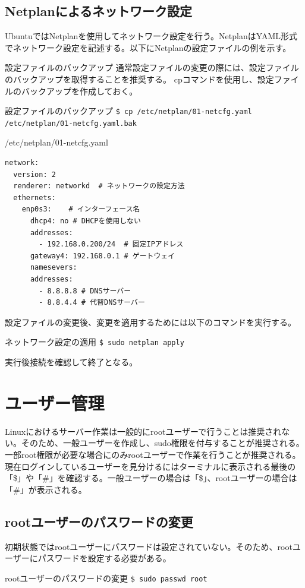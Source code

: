 \documentclass[a4paper, 11pt, dvipdfmx]{jsarticle}
\begin{document}
\subsection{Netplanによるネットワーク設定}
UbuntuではNetplanを使用してネットワーク設定を行う。NetplanはYAML形式でネットワーク設定を記述する。以下にNetplanの設定ファイルの例を示す。
\begin{attentionbox}{設定ファイルのバックアップ}
  通常設定ファイルの変更の際には、設定ファイルのバックアップを取得することを推奨する。
  cpコマンドを使用し、設定ファイルのバックアップを作成しておく。
  \begin{commandbox}{設定ファイルのバックアップ}
    \verb|$ cp /etc/netplan/01-netcfg.yaml /etc/netplan/01-netcfg.yaml.bak|
  \end{commandbox}
\end{attentionbox}
\begin{commandbox}{/etc/netplan/01-netcfg.yaml}
  \begin{verbatim}
network:
  version: 2
  renderer: networkd  # ネットワークの設定方法
  ethernets:
    enp0s3:    # インターフェース名
      dhcp4: no # DHCPを使用しない
      addresses: 
        - 192.168.0.200/24  # 固定IPアドレス
      gateway4: 192.168.0.1 # ゲートウェイ
      namesevers:
      addresses:
        - 8.8.8.8 # DNSサーバー
        - 8.8.4.4 # 代替DNSサーバー
  \end{verbatim}
\end{commandbox}
設定ファイルの変更後、変更を適用するためには以下のコマンドを実行する。
\begin{commandbox}{ネットワーク設定の適用}
  \verb|$ sudo netplan apply|
\end{commandbox}
実行後接続を確認して終了となる。
\section{ユーザー管理}
Linuxにおけるサーバー作業は一般的にrootユーザーで行うことは推奨されない。そのため、一般ユーザーを作成し、sudo権限を付与することが推奨される。一部root権限が必要な場合にのみrootユーザーで作業を行うことが推奨される。\\
現在ログインしているユーザーを見分けるにはターミナルに表示される最後の「\$」や「\#」を確認する。一般ユーザーの場合は「\$」、rootユーザーの場合は「\#」が表示される。
\subsection{rootユーザーのパスワードの変更}
初期状態ではrootユーザーにパスワードは設定されていない。そのため、rootユーザーにパスワードを設定する必要がある。
\begin{commandbox}{rootユーザーのパスワードの変更}
  \verb|$ sudo passwd root|
\end{commandbox}
\end{document}
